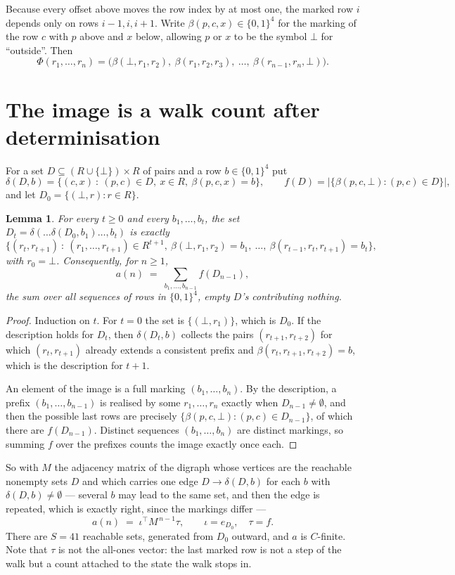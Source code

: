 \documentclass[11pt,a4paper]{article}
\theoremstyle{plain}
\newtheorem{lemma}[theorem]{Lemma}
\theoremstyle{definition}
\begin{document}
Because every offset above moves the row index by at most one, the marked row $i$ depends only
on rows $i-1,i,i+1$. Write $\beta(p,c,x)\in\{0,1\}^{4}$ for the marking of the row $c$
with $p$ above and $x$ below, allowing $p$ or $x$ to be the symbol $\bot$ for ``outside''.
Then
\[
\Phi(r_1,\dots,r_n)=\bigl(\beta(\bot,r_1,r_2),\ \beta(r_1,r_2,r_3),\ \dots,\
\beta(r_{n-1},r_n,\bot)\bigr).
\]

\section{The image is a walk count after determinisation}

For a set $D\subseteq(R\cup\{\bot\})\times R$ of pairs and a row $b\in\{0,1\}^{4}$ put
\[
\delta(D,b)=\{(c,x)\ :\ (p,c)\in D,\ x\in R,\ \beta(p,c,x)=b\},\qquad
f(D)=\bigl|\{\beta(p,c,\bot):(p,c)\in D\}\bigr| ,
\]
and let $D_0=\{(\bot,r):r\in R\}$.

\begin{lemma}\label{lem:det}
For every $t\ge0$ and every $b_1,\dots,b_t$, the set
$D_t=\delta(\dots\delta(D_0,b_1)\dots,b_t)$ is exactly
\[
\{(r_t,r_{t+1})\ :\ (r_1,\dots,r_{t+1})\in R^{t+1},\ \beta(\bot,r_1,r_2)=b_1,\ \dots,\
\beta(r_{t-1},r_t,r_{t+1})=b_t\} ,
\]
with $r_0=\bot$. Consequently, for $n\ge1$,
\[
a(n)\;=\;\sum_{b_1,\dots,b_{n-1}}f(D_{n-1}),
\]
the sum over all sequences of rows in $\{0,1\}^{4}$, empty $D$'s contributing nothing.
\end{lemma}

\begin{proof}
Induction on $t$. For $t=0$ the set is $\{(\bot,r_1)\}$, which is $D_0$. If the description
holds for $D_t$, then $\delta(D_t,b)$ collects the pairs $(r_{t+1},r_{t+2})$ for which
$(r_t,r_{t+1})$ already extends a consistent prefix and
$\beta(r_t,r_{t+1},r_{t+2})=b$, which is the description for $t+1$.

An element of the image is a full marking $(b_1,\dots,b_n)$. By the description, a prefix
$(b_1,\dots,b_{n-1})$ is realised by some $r_1,\dots,r_n$ exactly when $D_{n-1}\neq
\emptyset$, and then the possible last rows are precisely
$\{\beta(p,c,\bot):(p,c)\in D_{n-1}\}$, of which there are $f(D_{n-1})$. Distinct
sequences $(b_1,\dots,b_n)$ are distinct markings, so summing $f$ over the prefixes counts the
image exactly once each.
\end{proof}

So with $M$ the adjacency matrix of the digraph whose vertices are the reachable nonempty sets
$D$ and which carries one edge $D\to\delta(D,b)$ for each $b$ with $\delta(D,b)\neq\emptyset$
--- several $b$ may lead to the same set, and then the edge is repeated, which is exactly
right, since the markings differ ---
\[
a(n)\;=\;\iota^{\!\top}M^{\,n-1}\tau,\qquad \iota=e_{D_0},\quad \tau=f .
\]
There are $S=41$ reachable sets, generated from $D_0$ outward, and $a$ is $C$-finite. Note
that $\tau$ is not the all-ones vector: the last marked row is not a step of the walk but a
count attached to the state the walk stops in.
\end{document}
